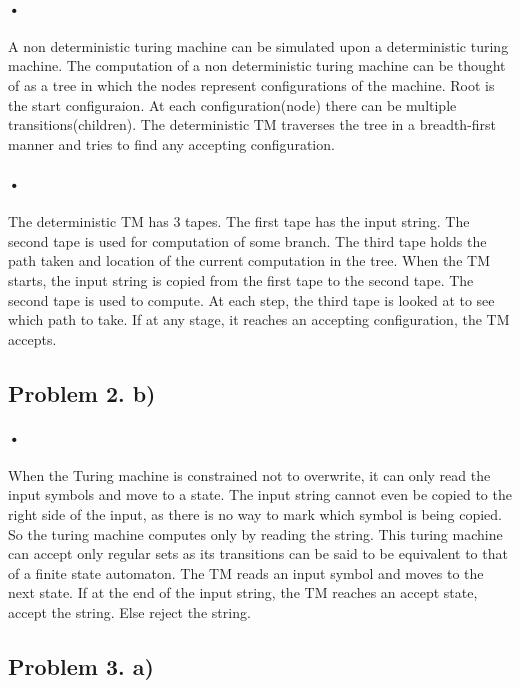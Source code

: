 \documentclass[12pt]{article}
\begin{document}
	\paragraph{•}
	A non deterministic turing machine can be simulated upon a deterministic turing machine. The computation of a non deterministic turing machine can be thought of as a tree in which the nodes represent configurations of the machine. Root is the start configuraion. At each configuration(node) there can be multiple transitions(children). The deterministic TM traverses the tree in a breadth-first manner and tries to find any accepting configuration. 
	\paragraph{•}
	The deterministic TM has 3 tapes. The first tape has the input string. The second tape is used for computation of some branch. The third tape holds the path taken and location of the current computation in the tree. When the TM starts, the input string is copied from the first tape to the second tape. The second tape is used to compute. At each step, the third tape is looked at to see which path to take. If at any stage, it reaches an accepting configuration, the TM accepts.
	
\subsection{Problem 2. b)}
\paragraph{•}
	When the Turing machine is constrained not to overwrite, it can only read the input symbols and move to a state. The input string cannot even be copied to the right side of the input, as there is no way to mark which symbol is being copied. So the turing machine computes only by reading the string. This turing machine can accept only regular sets as its transitions can be said to be equivalent to that of a finite state automaton. The TM reads an input symbol and moves to the next state. If at the end of the input string, the TM reaches an accept state, accept the string. Else reject the string. \\
	
\subsection{Problem 3. a)}
\end{document}
